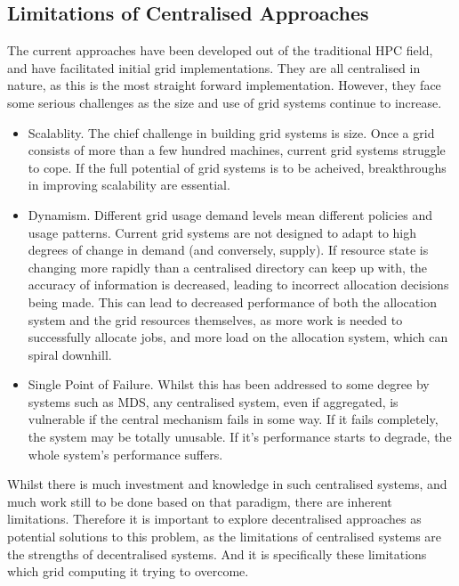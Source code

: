 \subsection{Limitations of Centralised Approaches}

The current approaches have been developed out of the traditional HPC field,
and have facilitated initial grid implementations. They are all centralised in
nature, as this is the most straight forward implementation.  However, they
face some serious challenges as the size and use of grid systems continue to
increase.

\begin{itemize}

  \item Scalablity. The chief challenge in building grid systems is size. Once
    a grid consists of more than a few hundred machines, current grid systems
    struggle to cope. If the full potential of grid systems is to be acheived,
    breakthroughs in improving scalability are essential.

  \item Dynamism. Different grid usage demand levels mean different policies
    and usage patterns. Current grid systems are not designed to adapt to high
    degrees of change in demand (and conversely, supply). If resource state is
    changing more rapidly than a centralised directory can keep up with, the
    accuracy of information is decreased, leading to incorrect allocation
    decisions being made. This can lead to decreased performance of both the
    allocation system and the grid resources themselves, as more work is needed
    to successfully allocate jobs, and more load on the allocation system,
    which can spiral downhill.

  \item Single Point of Failure. Whilst this has been addressed to some degree
    by systems such as MDS, any centralised system, even if aggregated, is
    vulnerable if the central mechanism fails in some way. If it fails
    completely, the system may be totally unusable. If it's performance starts
    to degrade, the whole system's performance suffers.

\end{itemize}

Whilst there is much investment and knowledge in such centralised systems, and
much work still to be done based on that paradigm, there are inherent
limitations. Therefore it is important to explore decentralised approaches as
potential solutions to this problem, as the limitations of centralised systems
are the strengths of decentralised systems. And it is specifically these
limitations which grid computing it trying to overcome. 




